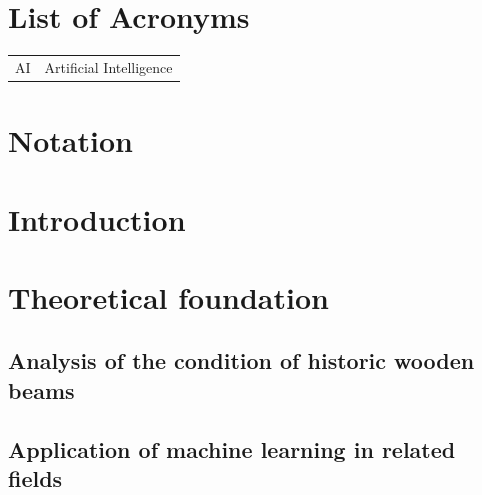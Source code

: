 \documentclass{xai-thesis}
\begin{document}
\section*{List of Acronyms}
\begin{tabular}{@{}ll}
AI & Artificial Intelligence\\
\end{tabular}

\clearpage
\section*{Notation}



\cleardoublepage
\pagestyle{headings}
\setcounter{page}{1}


\section{Introduction}
\label{sec:intro}





\newpage
\section{Theoretical foundation}
\label{sec:first}

\subsection{Analysis of the condition of historic wooden beams}
\label{subsec:first}

\subsection{Application of machine learning in related fields}
\label{subsec:second}
\end{document}
